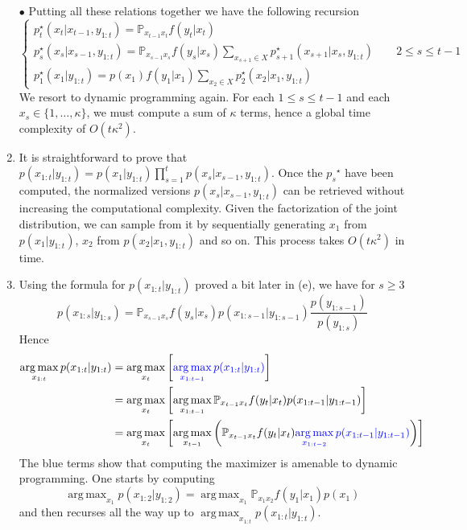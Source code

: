 \documentclass[a4paper,11pt, hidelinks]{article}
\DeclareMathOperator*{\argmax}{arg\,max}
\begin{document}
\begin{enumerate}[label=(\alph*)]
	$\bullet$ Putting all these relations together we have the following recursion $$\begin{cases}
		\displaystyle p_t^\star(x_t|x_{t-1},y_{1:t}) = \mathbb P_{x_{t-1} x_t} f(y_t|x_t)\\
		\displaystyle p_s^\star(x_s|x_{s-1},y_{1:t}) = \mathbb P_{x_{s-1} x_s} f(y_s|x_s) \sum_{x_{s+1}\in X} p_{s+1}^\star(x_{s+1}|x_{s},y_{1:t})\quad \quad 2\leq s \leq t-1\\
		\displaystyle p_1^\star(x_1|y_{1:t}) = p(x_1) f(y_1|x_1) \sum_{x_2\in X} p_2^\star(x_2|x_1,y_{1:t})
	\end{cases}$$
	We resort to dynamic programming again. For each $1\leq s\leq t-1$ and each $x_s\in \{1,\ldots,\kappa\}$, we must compute a sum of $\kappa$ terms, hence a global time complexity of $O(t\kappa^2)$.

	\item It is straightforward to prove that $\displaystyle p(x_{1:t}|y_{1:t}) = p(x_1|y_{1:t}) \prod_{s=1}^t p(x_s|x_{s-1},y_{1:t})$.\newline 
	Once the ${p_s}^\star$ have been computed, the normalized versions $p(x_s|x_{s-1},y_{1:t})$ can be retrieved without increasing the computational complexity. Given the factorization of the joint distribution, we can sample from it by sequentially generating $x_1$ from $p(x_1|y_{1:t})$, $x_2$ from $p(x_2|x_{1},y_{1:t})$ and so on. This process takes $O(t\kappa^2)$ in time.

	\item Using the formula for $p(x_{1:t}|y_{1:t})$ proved a bit later in (e), we have for $s\geq 3$ $$p(x_{1:s}|y_{1:s}) = \mathbb P_{x_{s-1} x_s} f(y_s|x_s) p(x_{1:s-1}|y_{1:s-1}) \frac{p(y_{1:s-1})}{p(y_{1:s})}$$
	Hence  $$\begin{aligned}
	\argmax_{x_{1:t}} p(x_{1:t}|y_{1:t}) &= \argmax_{x_t}\left[\mathbin{\textcolor{blue}{\argmax_{x_{1:t-1}} p(x_{1:t}|y_{1:t})}} \right]\\
	&= \argmax_{x_t}\left[\argmax_{x_{1:t-1}}\mathbb P_{x_{t-1} x_t} f(y_t|x_t) p(x_{1:t-1}|y_{1:t-1}) \right]\\
	&= \argmax_{x_t}\left[\argmax_{x_{t-1}}\left( \mathbb P_{x_{t-1} x_t} f(y_t|x_t) \mathbin{\textcolor{blue}{\argmax_{x_{1:t-2}} p(x_{1:t-1}|y_{1:t-1})}} \right)\right]
	\end{aligned}
	$$
	The blue terms show that computing the maximizer is amenable to dynamic programming. One starts by computing $$\argmax_{x_{1}} p(x_{1:2}|y_{1:2}) = \argmax_{x_{1}} \mathbb P_{x_{1} x_2} f(y_1|x_1)p(x_1)$$
	and then recurses all the way up to $\argmax_{x_{1:t}} p(x_{1:t}|y_{1:t})$.


\end{enumerate}
\end{document}
